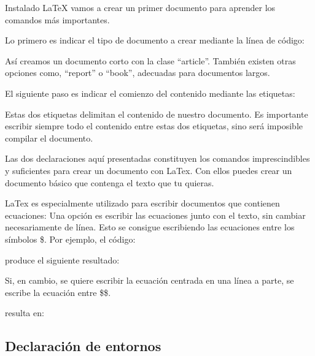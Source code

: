\documentclass[11pt, a4paper]{article}
\begin{document}
Instalado LaTeX vamos a crear un primer documento para aprender los comandos más importantes.

Lo primero es indicar el tipo de documento a crear mediante la línea de código:

	
Así creamos un documento corto con la clase “article”. También existen otras opciones como, “report” o “book”, adecuadas para documentos largos.

El siguiente paso es indicar el comienzo del contenido mediante las etiquetas:

	
 
	
Estas dos etiquetas delimitan el contenido de nuestro documento. Es importante escribir siempre todo el contenido entre estas dos etiquetas, sino será imposible compilar el documento.

Las dos declaraciones aquí presentadas constituyen los comandos imprescindibles y suficientes para crear un documento con LaTex. Con ellos puedes crear un documento básico que contenga el texto que tu quieras.
	
LaTex es especialmente utilizado para escribir documentos que contienen ecuaciones:
Una opción es escribir las ecuaciones junto con el texto, sin cambiar necesariamente de línea. Esto se consigue escribiendo las ecuaciones entre los símbolos \$. Por ejemplo, el código:

	 
	
produce el siguiente resultado:

	 

Si, en cambio, se quiere escribir la ecuación centrada en una línea a parte, se escribe la ecuación entre \$\$. 

	 
	
resulta en:

	 

\subsection{Declaración de entornos}
\end{document}
